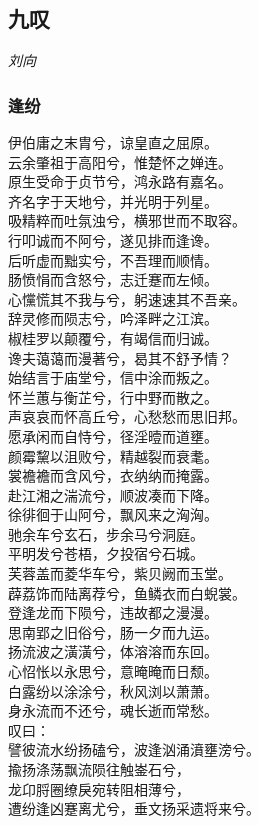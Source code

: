 \documentclass[]{article}
\begin{document}
\hypertarget{header-n3077}{%
\subsection{九叹}\label{header-n3077}}

\emph{刘向}

\hypertarget{header-n3082}{%
\subsubsection{逢纷}\label{header-n3082}}

伊伯庸之末胄兮，谅皇直之屈原。\\
云余肇祖于高阳兮，惟楚怀之婵连。\\
原生受命于贞节兮，鸿永路有嘉名。\\
齐名字于天地兮，并光明于列星。\\
吸精粹而吐氛浊兮，横邪世而不取容。\\
行叩诚而不阿兮，遂见排而逢谗。\\
后听虚而黜实兮，不吾理而顺情。\\
肠愤悁而含怒兮，志迁蹇而左倾。\\
心戃慌其不我与兮，躬速速其不吾亲。\\
辞灵修而陨志兮，吟泽畔之江滨。\\
椒桂罗以颠覆兮，有竭信而归诚。\\
谗夫蔼蔼而漫著兮，曷其不舒予情？\\
始结言于庙堂兮，信中涂而叛之。\\
怀兰蕙与衡芷兮，行中野而散之。\\
声哀哀而怀高丘兮，心愁愁而思旧邦。\\
愿承闲而自恃兮，径淫曀而道壅。\\
颜霉黧以沮败兮，精越裂而衰耄。\\
裳襜襜而含风兮，衣纳纳而掩露。\\
赴江湘之湍流兮，顺波凑而下降。\\
徐徘徊于山阿兮，飘风来之洶洶。\\
驰余车兮玄石，步余马兮洞庭。\\
平明发兮苍梧，夕投宿兮石城。\\
芙蓉盖而菱华车兮，紫贝阙而玉堂。\\
薜荔饰而陆离荐兮，鱼鳞衣而白蜺裳。\\
登逢龙而下陨兮，违故都之漫漫。\\
思南郢之旧俗兮，肠一夕而九运。\\
扬流波之潢潢兮，体溶溶而东回。\\
心怊怅以永思兮，意晻晻而日颓。\\
白露纷以涂涂兮，秋风浏以萧萧。\\
身永流而不还兮，魂长逝而常愁。\\
叹曰：\\
譬彼流水纷扬磕兮，波逢汹涌濆壅滂兮。\\
揄扬涤荡飘流陨往触崟石兮，\\
龙卬脟圈缭戾宛转阻相薄兮，\\
遭纷逢凶蹇离尤兮，垂文扬采遗将来兮。
\end{document}
